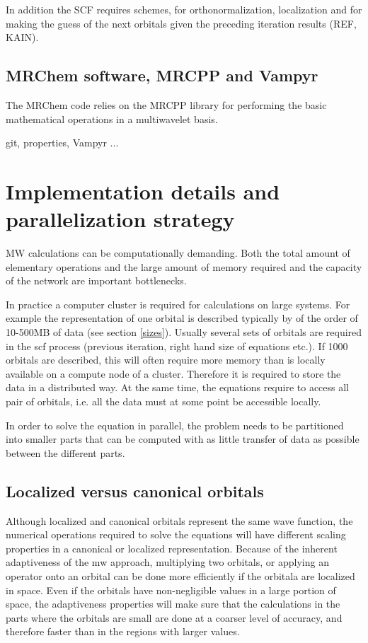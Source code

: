 \documentclass{article}
\begin{document}
In addition the SCF requires schemes, for orthonormalization, localization and for making the guess of the next orbitals given the preceding iteration results (REF, KAIN).

\subsection{MRChem software, MRCPP and Vampyr}
The MRChem code relies on the MRCPP library for performing the basic mathematical operations in a multiwavelet basis.

git, properties, Vampyr ...


\section{Implementation details and parallelization strategy}

MW calculations can be computationally demanding. Both the total amount of elementary operations and the large amount of memory required and the capacity of the network are important bottlenecks. 

In practice a computer cluster is required for calculations on large systems.
For example the representation of one orbital is described typically by of the order of 10-500MB of data (see section \ref{sizes}). Usually several sets of orbitals are required in the scf process (previous iteration, right hand size of equations etc.). If 1000 orbitals are described, this will often require more memory than is locally available on a compute node of a cluster. Therefore it is required to store the data in a distributed way. At the same time, the equations require to access all pair of orbitals, i.e. all the data must at some point be accessible locally.

In order to solve the equation in parallel, the problem needs to be partitioned into smaller parts that can be computed with as little transfer of data as possible between the different parts.



\subsection{Localized versus canonical orbitals}

Although localized and canonical orbitals represent the same wave function, the numerical operations required to solve the equations will have different scaling properties in a canonical or localized representation.
Because of the inherent adaptiveness of the mw approach, multiplying two orbitals, or applying an operator onto an orbital can be done more efficiently if the orbitala are localized in space. Even if the orbitals have non-negligible values in a large portion of space, the adaptiveness properties will make sure that the calculations in the parts where the orbitals are small are done at a coarser level of accuracy, and therefore faster than in the regions with larger values.
\end{document}
